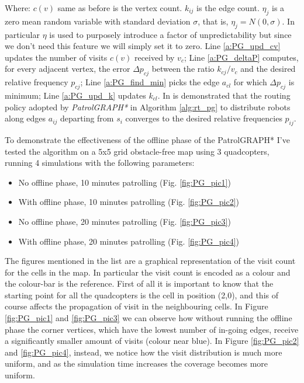 Where: $c(v)$ same as before is the vertex count. $k_{ij}$ is the edge count. $\eta_j$ is a zero mean random variable with standard deviation $\sigma$, that is, $\eta_j=N(0,\sigma)$. In particular $\eta$ is used to purposely introduce a factor of unpredictability but since we don't need this feature we will simply set it to zero. Line \ref{a:PG_upd_cv} updates the number of visits $c(v)$ received by $v_c$; Line \ref{a:PG_deltaP} computes, for every adjacent vertex, the error $\Delta p_{cj}$ between the ratio $k_{cj}/v_c$ and the desired relative frequency $p_{cj}$; Line \ref{a:PG_find_min} picks the edge $a_{cl}$ for which $\Delta p_{cj}$ is minimum; Line \ref{a:PG_upd_k} updates $k_{cl}$. 
In \cite{5711675} is demonstrated that the routing policy adopted by \textit{PatrolGRAPH*} in Algorithm \ref{alg:rt_pg} to distribute robots along edges $a_{ij}$ departing from $s_i$ converges to the desired relative frequencies $p_{ij}$.

To demonstrate the effectiveness of the offline phase of the PatrolGRAPH* I've tested the algorithm on a 5x5 grid obstacle-free map using 3 quadcopters, running 4 simulations with the following parameters: 
\begin{itemize}
\item No offline phase, 10 minutes patrolling (Fig. \ref{fig:PG_pic1})
\item With offline phase, 10 minutes patrolling (Fig. \ref{fig:PG_pic2})
\item No offline phase, 20 minutes patrolling (Fig. \ref{fig:PG_pic3})
\item With offline phase, 20 minutes patrolling (Fig. \ref{fig:PG_pic4})
\end{itemize}

The figures mentioned in the list are a graphical representation of the visit count for the cells in the map. In particular the visit count is encoded as a colour and the colour-bar is the reference. First of all it is important to know that the starting point for all the quadcopters is the cell in position (2,0), and this of course affects the propagation of visit in the neighbouring cells. In Figure \ref{fig:PG_pic1} and \ref{fig:PG_pic3} we can observe how without running the offline phase the corner vertices, which have the lowest number of in-going edges, receive a significantly smaller amount of visits (colour near blue).  In Figure \ref{fig:PG_pic2} and \ref{fig:PG_pic4}, instead, we notice how the visit distribution is much more uniform, and as the simulation time increases the coverage becomes more uniform.
~\\








